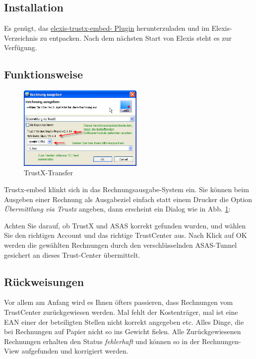 \subsection{Installation}
Es genügt, das \href{http://www.elexis.ch/files/elexis-trustx-embed.zip}{elexis-trustx-embed- Plugin} herunterzuladen und im Elexis-Verzeichnis zu entpacken. Nach dem nächsten Start von Elexis steht es zur Verfügung.

\subsection{Funktionsweise}
\begin{figure}
\includegraphics[width=6cm]{images/trustx.png}
\caption{TrustX-Transfer}
\label{fig:trustx}
\end{figure}

Trustx-embed klinkt sich in das Rechnungsaus\-gabe-System ein. Sie können beim Ausgeben einer Rechnung als Ausgabeziel einfach statt einem Drucker die Option \textit{Übermittlung via Trustx} angeben, dann erscheint ein Dialog wie in Abb. \ref{fig:trustx}:

Achten Sie darauf, ob TrustX und ASAS korrekt gefunden wurden, und wählen Sie den richtigen Account und das richtige TrustCenter aus. Nach Klick auf OK werden die gewählten Rechnungen durch den verschlüsselnden ASAS-Tunnel gesichert an dieses Trust-Center übermittelt.

\subsection{Rückweisungen}
Vor allem am Anfang wird es Ihnen öfters passieren, dass Rechnungen vom TrustCenter zurückgewiesen werden. Mal fehlt der Kostenträger, mal ist eine EAN einer der beteiligten Stellen nicht korrekt angegeben etc. Alles Dinge, die bei Rechnungen auf Papier nicht so ins Gewicht fielen. Alle Zurückgewiesenen Rechnungen erhalten den Status \textit{fehlerhaft} und können so in der Rechnungen-View aufgefunden und korrigiert werden.

